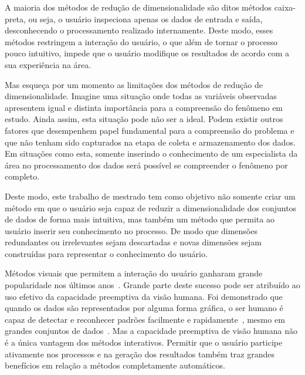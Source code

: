 A maioria dos métodos de redução de dimensionalidade são ditos métodos caixa-preta, ou seja, o usuário inspeciona apenas os dados de entrada e saída, desconhecendo o processamento realizado internamente. Deste modo, esses métodos restringem a interação do usuário, o que além de tornar o processo pouco intuitivo, impede que o usuário modifique os resultados de acordo com a sua experiência na área. 

Mas esqueça por um momento as limitações dos métodos de redução de dimensionalidade. Imagine uma situação onde todas as variáveis observadas apresentem igual e distinta importância para a compreensão do fenômeno em estudo. Ainda assim, esta situação pode não ser a ideal. Podem existir outros fatores que desempenhem papel fundamental para a compreensão do problema e que não tenham sido capturados na etapa de coleta e armazenamento dos dados. Em situações como esta, somente inserindo o conhecimento de um especialista da área no processamento dos dados será possível se compreender o fenômeno por completo. 

Deste modo, este trabalho de mestrado tem como objetivo não somente criar um método em que o usuário seja capaz de reduzir a dimensionalidade dos conjuntos de dados de forma mais intuitiva, mas também um método que permita ao usuário inserir seu conhecimento no processo. De modo que dimensões redundantes ou irrelevantes sejam descartadas e novas dimensões sejam construídas para representar o conhecimento do usuário. 

Métodos visuais que permitem a interação do usuário ganharam     grande popularidade nos últimos anos~\cite{State2012}.
Grande parte deste sucesso pode ser atribuído ao uso efetivo da  capacidade preemptiva da visão humana.
Foi demonstrado que quando os dados são representados por alguma forma gráfica, o ser humano é capaz de detectar e reconhecer     padrões facilmente e rapidamente~\cite{Healey1995}, mesmo em     grandes conjuntos de dados~\cite{Fodor2002}.
Mas a capacidade preemptiva de visão humana não é a única        vantagem dos métodos interativos. Permitir que o usuário         participe ativamente nos processos e na geração dos resultados   também traz grandes benefícios em relação a métodos              completamente automáticos.


